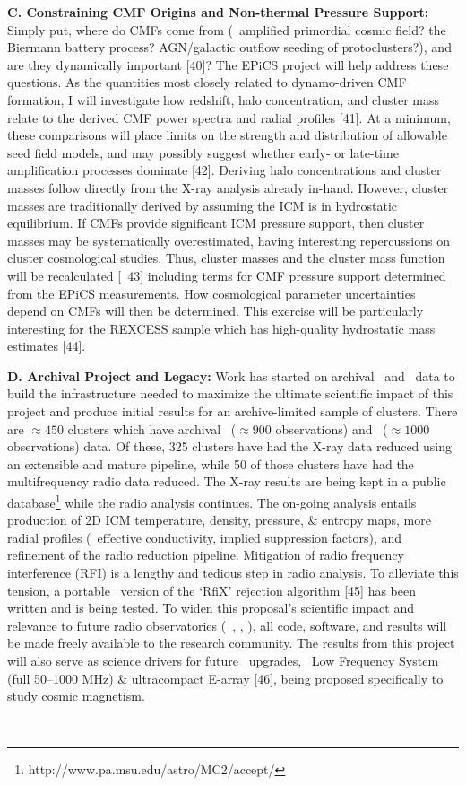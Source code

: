 \documentclass[letterpaper,12pt]{article}
\newcommand{\myhead}{Cavagnolo, Einstein Proposal}
\begin{document}
{\bf{C. Constraining CMF Origins and Non-thermal Pressure Support:}}
Simply put, where do CMFs come from (\eg\ amplified primordial cosmic
field?  the Biermann battery process?  AGN/galactic outflow seeding of
protoclusters?), and are they dynamically important [40]? The EPiCS
project will help address these questions. As the quantities most
closely related to dynamo-driven CMF formation, I will investigate how
redshift, halo concentration, and cluster mass relate to the derived
CMF power spectra and radial profiles [41]. At a minimum, these
comparisons will place limits on the strength and distribution of
allowable seed field models, and may possibly suggest whether early-
or late-time amplification processes dominate [42]. Deriving halo
concentrations and cluster masses follow directly from the X-ray
analysis already in-hand. However, cluster masses are traditionally
derived by assuming the ICM is in hydrostatic equilibrium. If CMFs
provide significant ICM pressure support, then cluster masses may be
systematically overestimated, having interesting repercussions on
cluster cosmological studies. Thus, cluster masses and the cluster
mass function will be recalculated [\eg\ 43] including terms for CMF
pressure support determined from the EPiCS measurements. How
cosmological parameter uncertainties depend on CMFs will then be
determined. This exercise will be particularly interesting for the
REXCESS sample which has high-quality hydrostatic mass estimates [44].

{\bf{D. Archival Project and Legacy:}} Work has started on archival
\chandra\ and \vla\ data to build the infrastructure needed to
maximize the ultimate scientific impact of this project and produce
initial results for an archive-limited sample of clusters. There are
$\approx 450$ clusters which have archival \chandra\ ($\approx 900$
observations) and \vla\ ($\approx 1000$ observations) data. Of these,
325 clusters have had the X-ray data reduced using an extensible and
mature pipeline, while 50 of those clusters have had the
multifrequency radio data reduced. The X-ray results are being kept in
a public database\footnote{http://www.pa.msu.edu/astro/MC2/accept/}
while the radio analysis continues. The on-going analysis entails
production of 2D ICM temperature, density, pressure, \& entropy maps,
more radial profiles (\eg\ effective conductivity, implied suppression
factors), and refinement of the radio reduction pipeline. Mitigation
of radio frequency interference (RFI) is a lengthy and tedious step in
radio analysis. To alleviate this tension, a portable \python\ version
of the `RfiX' rejection algorithm [45] has been written and is being
tested. To widen this proposal's scientific impact and relevance to
future radio observatories (\eg\ \lofar, \lwa, \ska), all code,
software, and results will be made freely available to the research
community. The results from this project will also serve as science
drivers for future \evla\ upgrades, \ie\ Low Frequency System (full
50--1000 MHz) \& ultracompact E-array [46], being proposed
specifically to study cosmic magnetism.\\

\markright{\myhead}\\



\markright{\myhead}




\end{document}
